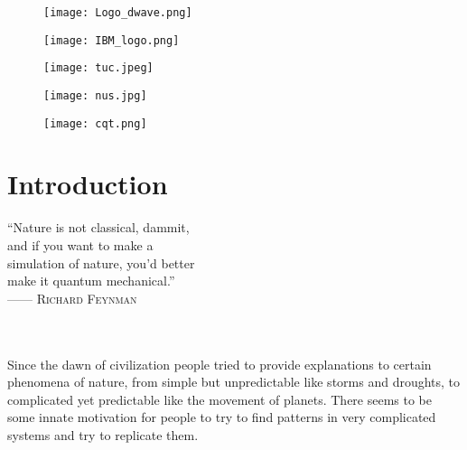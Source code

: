 \documentclass[12pt,a4paper]{report}
\newcommand{\fancyquote}[1]{{\fontfamily{pzc}\selectfont\large #1}} %
\begin{document}
\begin{figure}[b!]
  \centering
  \begin{minipage}{0.32\textwidth} %
    \texttt{[image: Logo\_dwave.png]} %
  \end{minipage}
  \hfill
  \begin{minipage}{0.32\textwidth}
    \texttt{[image: IBM\_logo.png]} %
  \end{minipage}
  \vspace{1em}

  \begin{minipage}{0.32\textwidth}
    \texttt{[image: tuc.jpeg]}
  \end{minipage}
  \hfill
  \begin{minipage}{0.32\textwidth}
    \texttt{[image: nus.jpg]}
  \end{minipage}
  \hfill
  \begin{minipage}{0.32\textwidth}
    \texttt{[image: cqt.png]}
  \end{minipage}
\end{figure}


\tableofcontents

\listoffigures

\chapter{Introduction}

\hfill
\begin{minipage}{0.4\textwidth}
\fancyquote{``Nature is not classical, dammit, \\
and if you want to make a \\
simulation of nature, you'd better \\
make it quantum mechanical.''} \\
------ \textsc{Richard Feynman}
\end{minipage} \\~\\

\noindent
Since the dawn of civilization people tried to provide explanations to certain phenomena of nature, from simple but unpredictable like storms and droughts, to complicated yet predictable like the movement of planets. There seems to be some innate motivation for people to try to find patterns in very complicated systems and try to replicate them. \\
\end{document}
